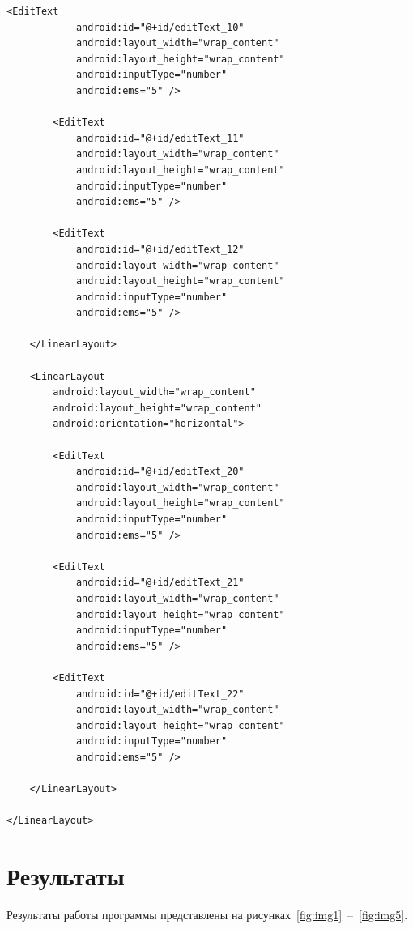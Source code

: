 \documentclass[a4paper, 14pt]{extarticle}
\begin{document}
\begin{lstlisting}[language={},caption={},label={lst:code1}]
        <EditText
            android:id="@+id/editText_10"
            android:layout_width="wrap_content"
            android:layout_height="wrap_content"
            android:inputType="number"
            android:ems="5" />

        <EditText
            android:id="@+id/editText_11"
            android:layout_width="wrap_content"
            android:layout_height="wrap_content"
            android:inputType="number"
            android:ems="5" />

        <EditText
            android:id="@+id/editText_12"
            android:layout_width="wrap_content"
            android:layout_height="wrap_content"
            android:inputType="number"
            android:ems="5" />

    </LinearLayout>

    <LinearLayout
        android:layout_width="wrap_content"
        android:layout_height="wrap_content"
        android:orientation="horizontal">

        <EditText
            android:id="@+id/editText_20"
            android:layout_width="wrap_content"
            android:layout_height="wrap_content"
            android:inputType="number"
            android:ems="5" />

        <EditText
            android:id="@+id/editText_21"
            android:layout_width="wrap_content"
            android:layout_height="wrap_content"
            android:inputType="number"
            android:ems="5" />

        <EditText
            android:id="@+id/editText_22"
            android:layout_width="wrap_content"
            android:layout_height="wrap_content"
            android:inputType="number"
            android:ems="5" />

    </LinearLayout>

</LinearLayout>

\end{lstlisting}

\section{Результаты}\label{Sect::res}

Результаты работы программы представлены на рисунках~\ref{fig:img1}~--~\ref{fig:img5}.     
\end{document}
